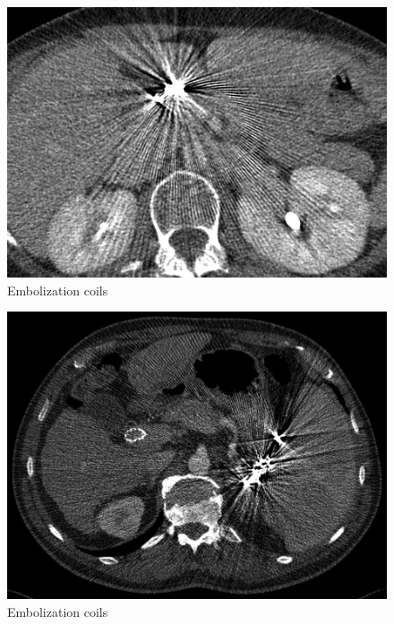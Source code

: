 \begin{figure}[h!]
	\centering
	\includegraphics[width=0.5\linewidth]{images/03_FBP.png}
	\caption{Embolization coils\cite{revisionrads}}
\end{figure}
\begin{figure}[h!]
	\centering
	\includegraphics[width=0.5\linewidth]{images/04_FBP.png}
	\caption{Embolization coils\cite{revisionrads}}
\end{figure}